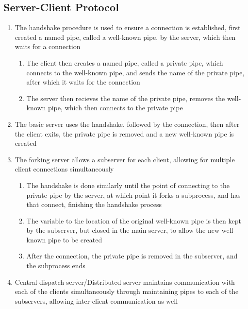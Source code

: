 \documentclass[11 pt, twoside]{article}
\begin{document}
\subsection{Server-Client Protocol}
\begin{enumerate}
\item The handshake procedure is used to ensure a connection is established, first created a named pipe, called a well-known pipe, by the server, which then waits for a connection
\begin{enumerate}
\item The client then creates a named pipe, called a private pipe, which connects to the well-known pipe, and sends the name of the private pipe, after which it waits for the connection
\item The server then recieves the name of the private pipe, removes the well-known pipe, which then connects to the private pipe
\end{enumerate}
\item The basic server uses the handshake, followed by the connection, then after the client exits, the private pipe is removed and a new well-known pipe is created
\item The forking server allows a subserver for each client, allowing for multiple client connections simultaneously
\begin{enumerate}
\item The handshake is done similarly until the point of connecting to the private pipe by the server, at which point it forks a subprocess, and has that connect, finishing the handshake process
\item The variable to the location of the original well-known pipe is then kept by the subserver, but closed in the main server, to allow the new well-known pipe to be created
\item After the connection, the private pipe is removed in the subserver, and the subprocess ends
\end{enumerate}
\item Central dispatch server/Distributed server maintains communication with each of the clients simultaneously through maintaining pipes to each of the subservers, allowing inter-client communication as well
\end{enumerate}
\end{document}
